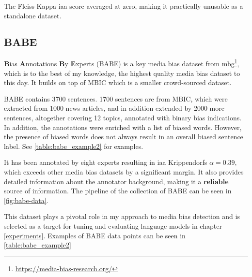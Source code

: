 The Fleiss Kappa \Gls{iaa} score averaged at zero, making it practically unusable as a standalone dataset.



\subsection{BABE}\label{babe}
\textbf{B}ias \textbf{A}nnotations \textbf{B}y \textbf{E}xperts (BABE)\cite{spinde2021neural} is a key media bias dataset from \Gls{mbg}\footnote{\url{https://media-bias-research.org/}}, which is to the best of my knowledge, the highest quality media bias dataset to this day. It builds on top of MBIC \cite{Spinde2021MBIC} which is a smaller crowd-sourced dataset.

BABE contains 3700 sentences. 1700 sentences are from MBIC, which were extracted from 1000 news articles, and in addition extended by 2000 more sentences, altogether covering 12 topics, annotated with binary bias indications. In addition, the annotations were enriched with a list of biased words. However, the presence of biased words does not always result in an overall biased sentence label. See \ref{table:babe_example2} for examples.

It has been annotated by eight experts resulting in \gls{iaa} Krippendorfs $\alpha = 0.39$, which exceeds other media bias datasets by a significant margin. It also provides detailed information about the annotator background, making it a \textbf{reliable} source of information. The pipeline of the collection of BABE can be seen in \ref{fig:babe-data}.

This dataset plays a pivotal role in my approach to media bias detection and is selected as a target for tuning and evaluating language models in chapter \ref{experiments}. Examples of BABE data points can be seen in 
\ref{table:babe_example2}




